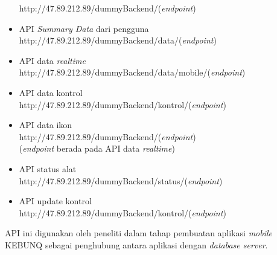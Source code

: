 \begin{flushleft}
\begin{justify}
\begin{itemize}
                http://47.89.212.89/dummyBackend/(\emph{endpoint})
                \item API \emph{Summary Data} dari pengguna\\
                http://47.89.212.89/dummyBackend/data/(\emph{endpoint})
                \item API data \emph{realtime}\\
                http://47.89.212.89/dummyBackend/data/mobile/(\emph{endpoint})
                \item API data kontrol\\
                http://47.89.212.89/dummyBackend/kontrol/(\emph{endpoint})
                \item API data ikon\\
                http://47.89.212.89/dummyBackend/(\emph{endpoint}) \\
                (\emph{endpoint} berada pada API data \emph{realtime})
                \item API status alat\\
                http://47.89.212.89/dummyBackend/status/(\emph{endpoint})
                \item API update kontrol\\
                http://47.89.212.89/dummyBackend/kontrol/(\emph{endpoint})
            \end{itemize}
        API ini digunakan oleh peneliti dalam tahap pembuatan aplikasi \emph{mobile} KEBUNQ sebagai penghubung antara aplikasi dengan \emph{database server}.\\
        

        

\end{justify}
\end{flushleft}
